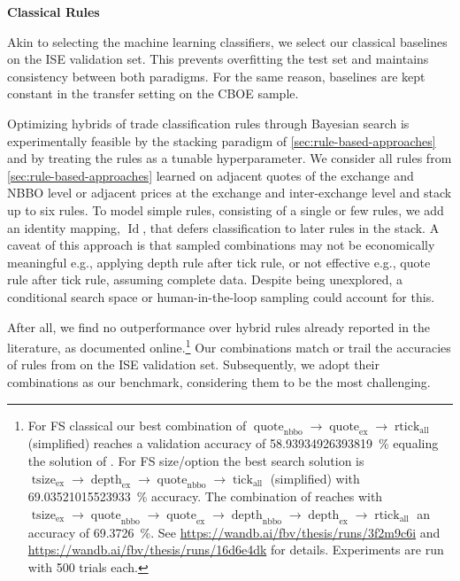 \textbf{Classical Rules}

Akin to selecting the machine learning classifiers, we select our classical baselines on the \gls{ISE} validation set. This prevents \gls{overfitting} the test set and maintains consistency between both paradigms. For the same reason, baselines are kept constant in the transfer setting on the \gls{CBOE} sample.

Optimizing hybrids of trade classification rules through Bayesian search is experimentally feasible by the stacking paradigm of \cref{sec:rule-based-approaches} and by treating the rules as a tunable hyperparameter. We consider all rules from \cref{sec:rule-based-approaches} learned on adjacent quotes of the exchange and \gls{NBBO} level or adjacent prices at the exchange and inter-exchange level and stack up to six rules. To model simple rules, consisting of a single or few rules, we add an identity mapping, $\operatorname{Id}$, that defers classification to later rules in the stack. A caveat of this approach is that sampled combinations may not be economically meaningful e.g., applying depth rule after tick rule, or not effective e.g., quote rule after tick rule, assuming complete data. Despite being unexplored, a conditional search space or human-in-the-loop sampling could account for this.

After all, we find no outperformance over hybrid rules already reported in the literature, as documented online.\footnote{For \gls{FS} classical our best combination of $\operatorname{quote}_{\mathrm{nbbo}} \to \operatorname{quote}_{\mathrm{ex}} \to \operatorname{rtick}_{\mathrm{all}}$ (simplified) reaches a validation accuracy of \SI{58.93934926393819}{\percent} equaling the solution of \textcite[][12]{grauerOptionTradeClassification2022}. For \gls{FS} size/option the best search solution is $\operatorname{tsize}_{\mathrm{ex}} \to \operatorname{depth}_{\mathrm{ex}} \to \operatorname{quote}_{\mathrm{nbbo}} \to \operatorname{tick}_{\mathrm{all}}$ (simplified) with \SI{69.03521015523933}{\percent} accuracy. The combination of \textcite[][14]{grauerOptionTradeClassification2022} reaches with $\operatorname{tsize}_{\mathrm{ex}} \to \operatorname{quote}_{\mathrm{nbbo}} \to \operatorname{quote}_{\mathrm{ex}} \to \operatorname{depth}_{\mathrm{nbbo}} \to \operatorname{depth}_{\mathrm{ex}} \to \operatorname{rtick}_{\mathrm{all}}$ an accuracy of \SI{69.3726}{\percent}. See \url{https://wandb.ai/fbv/thesis/runs/3f2m9c6i} and \url{https://wandb.ai/fbv/thesis/runs/16d6e4dk} for details. Experiments are run with \num{500} trials each.} Our combinations match or trail the accuracies of rules from \textcite[][12--14]{grauerOptionTradeClassification2022} on the \gls{ISE} validation set. Subsequently, we adopt their combinations as our benchmark, considering them to be the most challenging.

